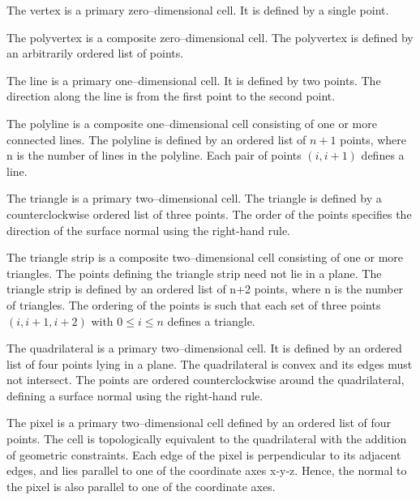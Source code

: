 \begin{description}[leftmargin=0cm,labelindent=0cm]

\item[Vertex.\index{cell!vertex}] The vertex is a primary zero--dimensional cell. It is defined by a single point.

\item[Polyvertex.\index{cell!polyvertex}\index{polyvertex}] The polyvertex is a composite zero--dimensional cell. The polyvertex is defined by an arbitrarily ordered list of points.

\item[Line.\index{cell!line}\index{line}] The line is a primary one--dimensional cell. It is defined by two points. The direction along the line is from the first point to the second point.

\item[Polyline.\index{cell!polyline}] The polyline is a composite one--dimensional cell consisting of one or more connected lines. The polyline is defined by an ordered list of $n+1$ points, where n is the number of lines in the polyline. Each pair of points $(i, i+1)$ defines a line.

\item[Triangle.\index{cell!triangle}] \label{subsec:linear_cells.triangle_strip} The triangle is a primary two--dimensional cell. The triangle is defined by a counterclockwise ordered list of three points. The order of the points specifies the direction of the surface normal using the right-hand rule.

\item[Triangle Strip.\index{cell!triangle strip}] The triangle strip is a composite two--dimensional cell consisting of one or more triangles. The points defining the triangle strip need not lie in a plane. The triangle strip is defined by an ordered list of n+2 points, where n is the number of triangles. The ordering of the points is such that each set of three points $(i,i+1,i+2)$ with $0 \leq i \leq n$ defines a triangle.

\item[Quadrilateral.\index{cell!quadrilateral}] The quadrilateral is a primary two--dimensional cell. It is defined by an ordered list of four points lying in a plane. The quadrilateral is convex and its edges must not intersect. The points are ordered counterclockwise around the quadrilateral, defining a surface normal using the right-hand rule.

\item[Pixel.\index{cell!pixel}\index{pixel}] The pixel is a primary two--dimensional cell defined by an ordered list of four points. The cell is topologically equivalent to the quadrilateral with the addition of geometric constraints. Each edge of the pixel is perpendicular to its adjacent edges, and lies parallel to one of the coordinate axes x-y-z. Hence, the normal to the pixel is also parallel to one of the coordinate axes.


\end{description}
